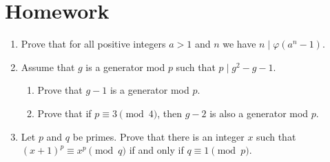\documentclass{article}
\begin{document}
\section{Homework}
\begin{enumerate}
  \item Prove that for all positive integers $a>1$ and $n$ we have
    $n\mid\varphi(a^n-1)$.
  \item Assume that $g$ is a generator mod $p$ such that $p\mid g^2-g-1$.
    \begin{enumerate}
      \item Prove that $g-1$ is a generator mod $p$.
      \item Prove that if $p\equiv 3\pmod 4$, then $g-2$ is also a generator mod
        $p$.
    \end{enumerate}
  \item Let $p$ and $q$ be primes. Prove that there is an integer $x$ such that
    $(x+1)^p\equiv x^p\pmod q$ if and only if $q\equiv 1\pmod p$.
\end{enumerate}
\end{document}
